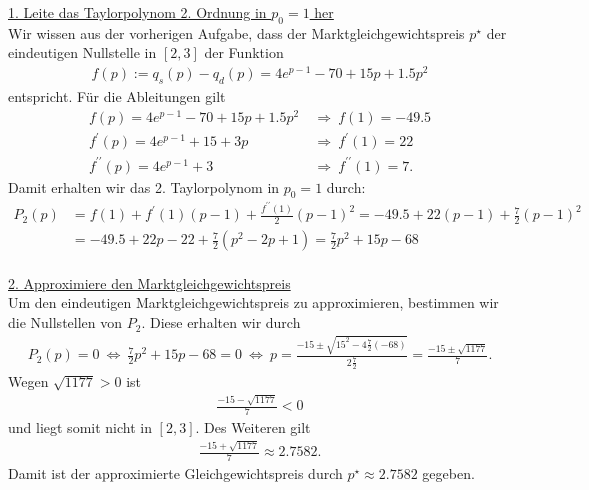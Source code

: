 \underline{1. Leite das Taylorpolynom 2. Ordnung in $ p_0 = 1 $ her}\\
Wir wissen aus der vorherigen Aufgabe, dass der Marktgleichgewichtspreis $ p^\star $ der eindeutigen Nullstelle in $ [2,3] $ der Funktion
\begin{align*}
f(p) := q_s(p) - q_d(p) 
=4 e^{p-1} - 70+15p+1.5p^2
\end{align*}
entspricht.
Für die Ableitungen gilt
\begin{align*}
f(p)  =4 e^{p-1} - 70+15p+1.5p^2 \ &\Rightarrow \ f(1) = -49.5  \\
f^\prime(p) = 4 e^{p-1}  +15+3p \ &\Rightarrow \ f^\prime(1) = 22\\
f^{\prime \prime}(p) = 4 e^{p-1}  +3
\ &\Rightarrow \
f^{\prime \prime}(1) = 7.
\end{align*}
Damit erhalten wir das 2. Taylorpolynom in $ p_0 = 1  $ durch:
\begin{align*}
P_2(p)
&= 
f(1) + f^\prime(1) (p - 1) + \frac{f^{\prime \prime}(1)}{2} (p-1)^2
=
-49.5 + 22 (p-1) + \frac{7}{2} (p-1)^2\\
&=
-49.5 +22p -22 + \frac{7}{2}(p^2 -2p+1)
=
\frac{7}{2} p^2 + 15 p - 68
\end{align*}
\ \\

\underline{2. Approximiere den Marktgleichgewichtspreis}\\
Um den eindeutigen Marktgleichgewichtspreis zu approximieren, bestimmen wir die Nullstellen von $ P_2 $.
Diese erhalten wir durch
\begin{align*}
P_2(p) = 0
\ \Leftrightarrow \
\frac{7}{2} p^2 + 15 p - 68 = 0
\ \Leftrightarrow \
p = 
\frac{-15 \pm \sqrt{15^2 -4 \frac{7}{2} (-68)}}{2 \frac{7}{2}}
=
\frac{-15 \pm \sqrt{1177}}{7}.
\end{align*}
Wegen $ \sqrt{1177} > 0 $ ist 
\begin{align*}
\frac{-15 - \sqrt{1177}}{7} < 0
\end{align*}
und liegt somit nicht in $ [2,3] $. Des Weiteren gilt
\begin{align*}
\frac{-15 + \sqrt{1177}}{7} \approx 2.7582.
\end{align*} 
Damit ist der approximierte Gleichgewichtspreis durch $ p^\star \approx 2.7582$ gegeben.

\newpage

